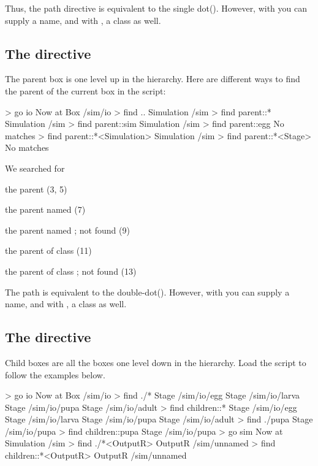 Thus, the path  directive is equivalent to the single dot(). However, with  you can supply a name, and with ,  a class as well.

%
%
\subsection{The  directive}
The parent box is one level up in the hierarchy. Here are different ways to find the parent of the current box in the  script:

\lstset{numbers=left}
\begin{usdialog}
> go io
Now at Box /sim/io
> find ..
Simulation /sim
> find parent::*
Simulation /sim
> find parent::sim
Simulation /sim
> find parent::egg
No matches
> find parent::*<Simulation>
Simulation /sim
> find parent::*<Stage>
No matches
\end{usdialog}
\lstset{numbers=none}

\noindent
We searched for 
\begin{compactitem}
\item the parent (3, 5)
\item the parent named  (7)
\item the parent named ; not found (9)
\item the parent of class  (11)
\item the parent of class ; not found (13)
\end{compactitem}

The path   is equivalent to the double-dot(). However, with  you can supply a name, and with ,  a class as well.

%
%
\subsection{The  directive}
Child boxes are all the boxes one level down in the hierarchy. Load the  script to follow the examples below.

\lstset{numbers=left}
\begin{usdialog}
> go io
Now at Box /sim/io
> find ./*
Stage /sim/io/egg
Stage /sim/io/larva
Stage /sim/io/pupa
Stage /sim/io/adult
> find children::*
Stage /sim/io/egg
Stage /sim/io/larva
Stage /sim/io/pupa
Stage /sim/io/adult
> find ./pupa
Stage /sim/io/pupa
> find children::pupa
Stage /sim/io/pupa
> go sim
Now at Simulation /sim
> find ./*<OutputR>
OutputR /sim/unnamed
> find children::*<OutputR>
OutputR /sim/unnamed
\end{usdialog}
\lstset{numbers=none}

